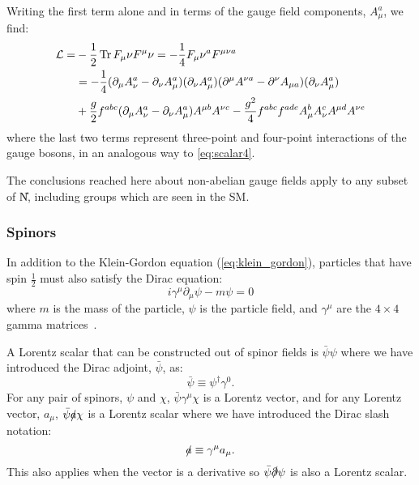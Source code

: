 Writing the first term alone and in terms of the gauge field components, $A_\mu^a$, we find:
\begin{align}
  \mathcal{L} = &-\frac{1}{2} \operatorname{Tr} F_\mu\nu F^\mu\nu = - \frac{1}{4} F_\mu\nu^a F^{\mu\nu a} \\
  &= -\frac{1}{4} (\partial_\mu A_\nu^a - \partial_\nu A_\mu^a) (\partial_\nu A^a_\mu) (\partial^\mu A^{\nu a} - \partial^\nu A_{\mu a}) (\partial_\nu A^a_\mu) \\
  &+ \frac{g}{2} f^{abc} (\partial_\mu A^a_\nu - \partial_\nu A^a_\mu) A^{\mu b}A^{\nu c} - \frac{g^2}{4} f^{abc} f^{ade} A_\mu^b A_\nu^c A^{\mu d} A^{\nu e}
\end{align}
where the last two terms represent three-point and four-point interactions of the gauge bosons, in an analogous way to \cref{eq:scalar4}. 

The conclusions reached here about non-abelian gauge fields apply to any subset of \U{N}, including  groups which are seen in the SM.

\subsubsection{Spinors}
In addition to the Klein-Gordon equation (\cref{eq:klein_gordon}), particles that have spin $\frac{1}{2}$ must also satisfy the Dirac equation:
\begin{equation}
  i \gamma^\mu \partial_\mu \psi - m \psi = 0
\end{equation}
where $m$ is the mass of the particle, $\psi$ is the particle field, and $\gamma^\mu$ are the $4\times4$ gamma matrices~\cite{Thomson:2013zua}. 

A Lorentz scalar that can be constructed out of spinor fields is $\bar{\psi} \psi$ where we have introduced the Dirac adjoint, $\bar{\psi}$, as: 
\begin{equation}
  \bar{\psi} \equiv \psi^\dag \gamma^0 .
\end{equation}
For any pair of spinors, $\psi$ and $\chi$, $\bar{\psi} \gamma^\mu \chi$ is a Lorentz vector, and for any Lorentz vector, $a_\mu$, $\bar{\psi} \slashed{a} \chi$ is a Lorentz scalar where we have introduced the Dirac slash notation:
\begin{equation}
  \slashed{a} \equiv \gamma^\mu a_\mu .
\end{equation}
This also applies when the vector is a derivative so $\bar{\psi}\slashed{\partial}\psi$ is also a Lorentz scalar.

